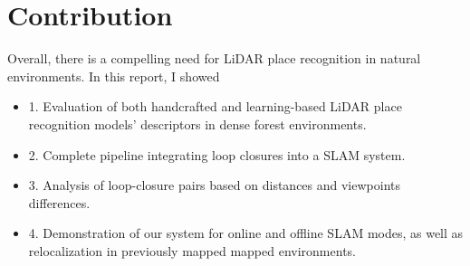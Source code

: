 \section{Contribution}
Overall, there is a compelling need for LiDAR place recognition in natural environments. 
In this report, I showed
\begin{itemize}
\item 1. Evaluation of both handcrafted and learning-based LiDAR place recognition models' descriptors in dense forest environments.

\item 2. Complete pipeline integrating loop closures into a SLAM system.

\item 3. Analysis of loop-closure pairs based on distances and viewpoints differences.

\item 4. Demonstration of our system for online and offline SLAM modes, as well as relocalization in previously mapped mapped environments. 

\end{itemize}



